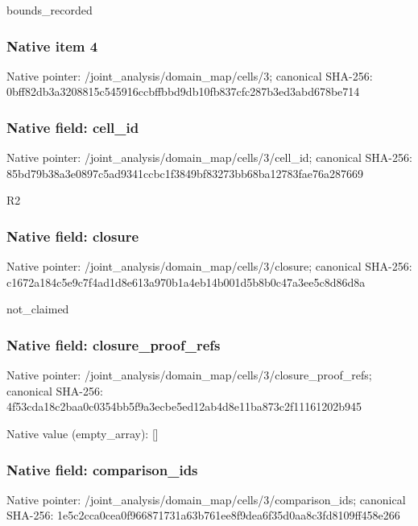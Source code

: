 \documentclass[10pt,a4paper]{article}
\begin{document}
\begingroup\raggedright\sloppy bounds\_\allowbreak{}recorded\par\endgroup

\subsubsection{Native item 4}
Native pointer: /joint\_\allowbreak{}analysis/domain\_\allowbreak{}map/cells/3; canonical SHA-256: 0bff82db3a3208815c545916ccbffbbd9db10fb837cfc287b3ed3abd678be714

\subsubsection{Native field: cell\_\allowbreak{}id}
Native pointer: /joint\_\allowbreak{}analysis/domain\_\allowbreak{}map/cells/3/cell\_\allowbreak{}id; canonical SHA-256: 85bd79b38a3e0897c5ad9341ccbc1f3849bf83273bb68ba12783fae76a287669

\begingroup\raggedright\sloppy R2\par\endgroup

\subsubsection{Native field: closure}
Native pointer: /joint\_\allowbreak{}analysis/domain\_\allowbreak{}map/cells/3/closure; canonical SHA-256: c1672a184c5e9c7f4ad1d8e613a970b1a4eb14b001d5b8b0c47a3ee5c8d86d8a

\begingroup\raggedright\sloppy not\_\allowbreak{}claimed\par\endgroup

\subsubsection{Native field: closure\_\allowbreak{}proof\_\allowbreak{}refs}
Native pointer: /joint\_\allowbreak{}analysis/domain\_\allowbreak{}map/cells/3/closure\_\allowbreak{}proof\_\allowbreak{}refs; canonical SHA-256: 4f53cda18c2baa0c0354bb5f9a3ecbe5ed12ab4d8e11ba873c2f11161202b945

Native value (empty\_\allowbreak{}array): []

\subsubsection{Native field: comparison\_\allowbreak{}ids}
Native pointer: /joint\_\allowbreak{}analysis/domain\_\allowbreak{}map/cells/3/comparison\_\allowbreak{}ids; canonical SHA-256: 1e5c2cca0cea0f966871731a63b761ee8f9dea6f35d0aa8c3fd8109ff458e266
\end{document}
